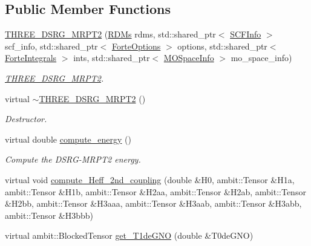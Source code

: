 \subsection*{Public Member Functions}
\begin{DoxyCompactItemize}
\item 
\mbox{\hyperlink{classforte_1_1_t_h_r_e_e___d_s_r_g___m_r_p_t2_accf4da4a0ee49164a246fed381672096}{T\+H\+R\+E\+E\+\_\+\+D\+S\+R\+G\+\_\+\+M\+R\+P\+T2}} (\mbox{\hyperlink{classforte_1_1_r_d_ms}{R\+D\+Ms}} rdms, std\+::shared\+\_\+ptr$<$ \mbox{\hyperlink{classforte_1_1_s_c_f_info}{S\+C\+F\+Info}} $>$ scf\+\_\+info, std\+::shared\+\_\+ptr$<$ \mbox{\hyperlink{classforte_1_1_forte_options}{Forte\+Options}} $>$ options, std\+::shared\+\_\+ptr$<$ \mbox{\hyperlink{classforte_1_1_forte_integrals}{Forte\+Integrals}} $>$ ints, std\+::shared\+\_\+ptr$<$ \mbox{\hyperlink{classforte_1_1_m_o_space_info}{M\+O\+Space\+Info}} $>$ mo\+\_\+space\+\_\+info)
\begin{DoxyCompactList}\small\item\em \mbox{\hyperlink{classforte_1_1_t_h_r_e_e___d_s_r_g___m_r_p_t2}{T\+H\+R\+E\+E\+\_\+\+D\+S\+R\+G\+\_\+\+M\+R\+P\+T2}}. \end{DoxyCompactList}\item 
virtual \mbox{\hyperlink{classforte_1_1_t_h_r_e_e___d_s_r_g___m_r_p_t2_a96155ef7c1f77bf2b47d52823dacffde}{$\sim$\+T\+H\+R\+E\+E\+\_\+\+D\+S\+R\+G\+\_\+\+M\+R\+P\+T2}} ()
\begin{DoxyCompactList}\small\item\em Destructor. \end{DoxyCompactList}\item 
virtual double \mbox{\hyperlink{classforte_1_1_t_h_r_e_e___d_s_r_g___m_r_p_t2_af7cee9b490ef09652f35cbfd48f8fe6a}{compute\+\_\+energy}} ()
\begin{DoxyCompactList}\small\item\em Compute the D\+S\+R\+G-\/\+M\+R\+P\+T2 energy. \end{DoxyCompactList}\item 
virtual void \mbox{\hyperlink{classforte_1_1_t_h_r_e_e___d_s_r_g___m_r_p_t2_ad06666e1f7f43f146e32bee6fe9d4ab7}{compute\+\_\+\+Heff\+\_\+2nd\+\_\+coupling}} (double \&H0, ambit\+::\+Tensor \&H1a, ambit\+::\+Tensor \&H1b, ambit\+::\+Tensor \&H2aa, ambit\+::\+Tensor \&H2ab, ambit\+::\+Tensor \&H2bb, ambit\+::\+Tensor \&H3aaa, ambit\+::\+Tensor \&H3aab, ambit\+::\+Tensor \&H3abb, ambit\+::\+Tensor \&H3bbb)
\item 
virtual ambit\+::\+Blocked\+Tensor \mbox{\hyperlink{classforte_1_1_t_h_r_e_e___d_s_r_g___m_r_p_t2_a287c2ec19c2d42cce0cdc08133e43789}{get\+\_\+\+T1de\+G\+NO}} (double \&T0de\+G\+NO)

\end{DoxyCompactItemize}
